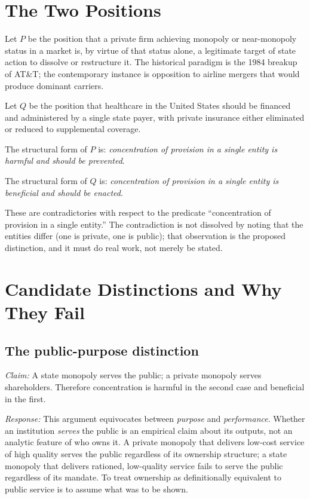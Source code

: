 \documentclass[11pt]{article}
\begin{document}
\section{The Two Positions}

Let $P$ be the position that a private firm achieving monopoly or near-monopoly status in a market is, by virtue of that status alone, a legitimate target of state action to dissolve or restructure it. The historical paradigm is the 1984 breakup of AT\&T; the contemporary instance is opposition to airline mergers that would produce dominant carriers.

Let $Q$ be the position that healthcare in the United States should be financed and administered by a single state payer, with private insurance either eliminated or reduced to supplemental coverage.

The structural form of $P$ is: \emph{concentration of provision in a single entity is harmful and should be prevented}.

The structural form of $Q$ is: \emph{concentration of provision in a single entity is beneficial and should be enacted}.

These are contradictories with respect to the predicate ``concentration of provision in a single entity.'' The contradiction is not dissolved by noting that the entities differ (one is private, one is public); that observation is the proposed distinction, and it must do real work, not merely be stated.

\section{Candidate Distinctions and Why They Fail}

\subsection{The public-purpose distinction}\label{sec:public-purpose}

\emph{Claim:} A state monopoly serves the public; a private monopoly serves shareholders. Therefore concentration is harmful in the second case and beneficial in the first.

\emph{Response:} This argument equivocates between \emph{purpose} and \emph{performance}. Whether an institution \emph{serves} the public is an empirical claim about its outputs, not an analytic feature of who owns it. A private monopoly that delivers low-cost service of high quality serves the public regardless of its ownership structure; a state monopoly that delivers rationed, low-quality service fails to serve the public regardless of its mandate. To treat ownership as definitionally equivalent to public service is to assume what was to be shown.
\end{document}
